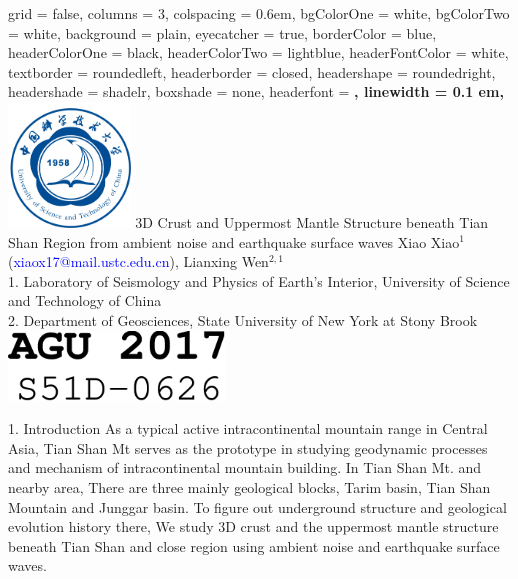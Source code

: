 \documentclass[
    landscape,      %
    paperwidth = 1200mm,
    paperheight = 900mm,
    fontscale = 0.4,
    margin = 1.7cm,
]{baposter}
\begin{document}
\begin{poster}{
    grid = false,            %
    columns = 3,
    colspacing = 0.6em,
    bgColorOne = white,
    bgColorTwo = white,
    background = plain,     %
    eyecatcher = true,      %
    borderColor = blue,
    headerColorOne = black,
    headerColorTwo = lightblue,
    headerFontColor = white,
    textborder = roundedleft,   %
    headerborder = closed,      %
    headershape = roundedright, %
    headershade = shadelr,      %
    boxshade = none,            %
    headerfont = \Large\bf\textsc,
    linewidth = 0.1 em,}
{\includegraphics[height=9em]{USTC_logo_blue.jpg}}
{\Huge{3D Crust and Uppermost Mantle Structure beneath Tian Shan Region from ambient noise and earthquake surface waves}}
{
    \vspace{0.3em}
    Xiao Xiao$^1$ (\textcolor{blue}{xiaox17@mail.ustc.edu.cn}),
    Lianxing Wen$^{2,1}$ \\
    \vspace{0.3em}
    1. Laboratory of Seismology and Physics of Earth's Interior, University of Science and Technology of China  \\
    2. Department of Geosciences, State University of New York at Stony Brook  \\
}
{\includegraphics[height=5em]{2017_AGU_ID}}
\vspace{0.4cm}

\begin{posterbox}[column=0, row=0]{1. Introduction}
\setlength{\parskip}{3pt}
As a typical active intracontinental mountain range in Central Asia, Tian
Shan Mt serves as the prototype in studying geodynamic processes and mechanism
of intracontinental mountain building. In Tian Shan Mt. and nearby area,  There are three mainly geological blocks,
Tarim basin, Tian Shan Mountain and Junggar basin. To figure out underground structure and geological evolution history there,
We study 3D crust and the uppermost mantle structure beneath Tian Shan and close region
using ambient noise and earthquake surface waves.
\end{posterbox}


\end{poster}
\end{document}
